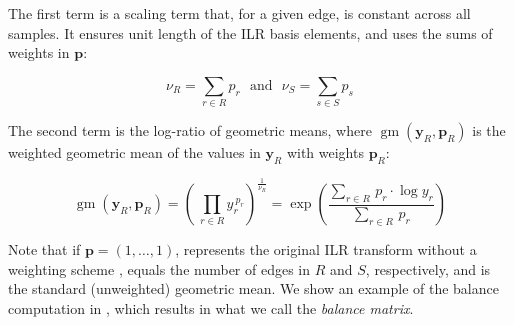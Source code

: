 The first term is a scaling term that, for a given edge, is constant across all samples.
It ensures unit length of the ILR basis elements, and uses the sums of weights in $\bm{p}$:

\begin{equation}
    \label{ch:Balances:sec:Methods:eq:WeightSums}
    \nu_R = \sum_{r \in R} p_r  ~~~\mbox{and}~~~  \nu_S = \sum_{s \in S} p_s
\end{equation}

The second term is the log-ratio of geometric means, where $\operatorname{gm}( \bm{y}_R, \bm{p}_R )$
is the weighted geometric mean of the values in $\bm{y}_R$ with weights $\bm{p}_R$:

\begin{equation}
    \label{ch:Balances:sec:Methods:eq:GeometricMean}
    \operatorname{gm}( \bm{y}_R, \bm{p}_R )
    = \left(~ \prod_{r \in R} y_r ^ {~p_r} \right) ^ { \frac{1}{ \nu_R } }
    = \exp \left( \frac{ \sum_{r \in R} \, p_r \cdot \log y_r }{ \sum_{r \in R} \, p_r } \right)
\end{equation}

Note that if $\bm{p} = ( 1, \ldots, 1 )$, %
represents the original ILR transform without a weighting scheme \cite{Egozcue2003},
 equals the number of edges in $R$ and $S$, respectively,
and  is the standard (unweighted) geometric mean.
We show an example of the balance computation in ,
which results in what we call the \emph{balance matrix}.

